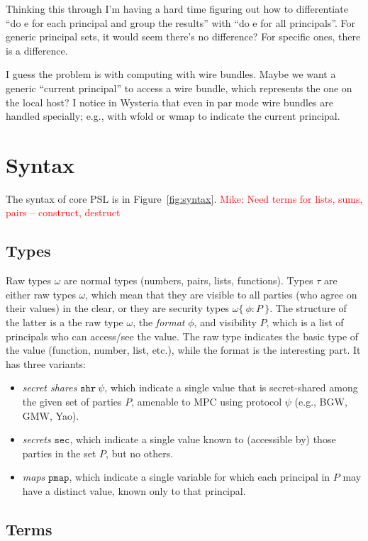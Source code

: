 \documentclass[10pt]{article}
\newcommand{\ssec}{\ensuremath{\mathtt{sec}}}
\newcommand{\isec}{\ensuremath{\mathtt{pmap}}}
\newcommand{\sshare}[1]{\ensuremath{\mathtt{shr}~{#1}}}
\newcommand{\sectyp}[3]{\ensuremath{{#1} \{~{#2}:{#3}~\}}}
\newcommand{\mwh}[1]{\textcolor{red}{Mike: #1}}
\begin{document}
Thinking this through I'm having a hard time figuring out how to
differentiate ``do e for each principal and group the results'' with
``do e for all principals''. For generic principal sets, it would seem
there's no difference? For specific ones, there is a difference.

I guess the problem is with computing with wire bundles. Maybe we want
a generic ``current principal'' to access a wire bundle, which
represents the one on the local host? I notice in Wysteria that even
in par mode wire bundles are handled specially; e.g., with wfold or
wmap to indicate the current principal.

\section{Syntax}

The syntax of core PSL is in Figure~\ref{fig:syntax}. \mwh{Need terms for
lists, sums, pairs -- construct, destruct}

\subsection{Types}

Raw types $\omega$ are normal types (numbers, pairs, lists,
functions). Types $\tau$ are either raw types $\omega$, which mean
that they are visible to all parties (who agree on their values) in
the clear, or they are security types $\sectyp{\omega}{\phi}{P}$. The
structure of the latter is a the raw type $\omega$, the \emph{format}
$\phi$, and visibility $P$, which is a list of principals who can
access/see the value.  The raw type indicates the basic type of the
value (function, number, list, etc.), while the format is the
interesting part. It has three variants:
\begin{itemize}
\item \emph{secret shares} $\sshare\psi$, which indicate a single
  value that is secret-shared among the given set of parties $P$,
  amenable to MPC using protocol $\psi$ (e.g., BGW, GMW, Yao).
\item \emph{secrets} \ssec, which indicate a single value known to
  (accessible by) those parties in the set $P$, but no others.
\item \emph{maps} \isec, which indicate a single variable for which
  each principal in $P$ may have a distinct value, known only to that
  principal. 
\end{itemize}

\subsection{Terms}
\end{document}
